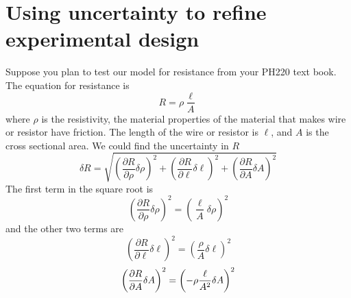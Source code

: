 \section{Using uncertainty to refine experimental design}

Suppose you plan to test our model for resistance from your PH220 text book.
The equation for resistance is 
\begin{equation*}
R=\rho \frac{\ell }{A}
\end{equation*}%
where $\rho $ is the resistivity, the material properties of the material
that makes wire or resistor have friction. The length of the wire or
resistor is $\ell $, and $A$ is the cross sectional area. We could find the
uncertainty in $R$%
\begin{equation*}
\delta R=\sqrt{\left( \frac{\partial R}{\partial \rho }\delta \rho \right)
^{2}+\left( \frac{\partial R}{\partial \ell }\delta \ell \right) ^{2}+\left( 
\frac{\partial R}{\partial A}\delta A\right) ^{2}}
\end{equation*}%
The first term in the square root is 
\begin{equation*}
\left( \frac{\partial R}{\partial \rho }\delta \rho \right) ^{2}=\left( 
\frac{\ell }{A}\delta \rho \right) ^{2}
\end{equation*}%
and the other two terms are 
\begin{equation*}
\left( \frac{\partial R}{\partial \ell }\delta \ell \right) ^{2}=\left( 
\frac{\rho }{A}\delta \ell \right) ^{2}
\end{equation*}%
\begin{equation*}
\left( \frac{\partial R}{\partial A}\delta A\right) ^{2}=\left( -\rho \frac{%
\ell }{A^{2}}\delta A\right) ^{2}
\end{equation*}

